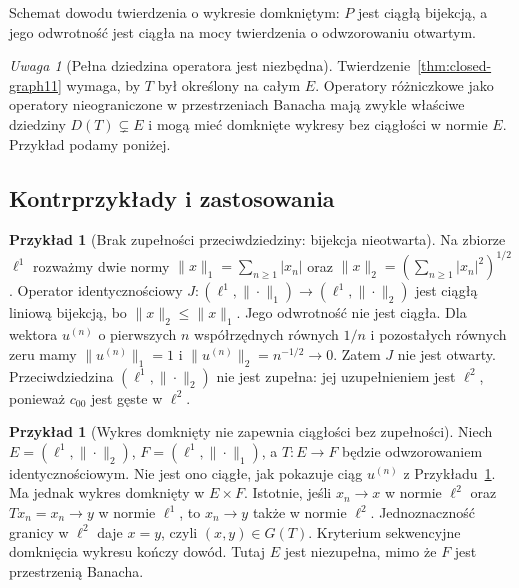 \documentclass[11pt,a4paper]{article}
\numberwithin{equation}{section}
\theoremstyle{plain}
\theoremstyle{definition}
\newtheorem{przyklad}[twierdzenie]{Przykład}
\theoremstyle{remark}
\newtheorem{uwaga}[twierdzenie]{Uwaga}
\begin{document}
\begin{center}

\smallskip
\small Schemat dowodu twierdzenia o wykresie domkniętym:
$P$ jest ciągłą bijekcją, a jego odwrotność jest ciągła
na mocy twierdzenia o odwzorowaniu otwartym.
\end{center}

\begin{uwaga}[Pełna dziedzina operatora jest niezbędna]
Twierdzenie~\ref{thm:closed-graph11} wymaga, by $T$ był
określony na całym $E$. Operatory różniczkowe jako
operatory nieograniczone w przestrzeniach Banacha mają
zwykle właściwe dziedziny $D(T)\subsetneq E$ i mogą
mieć domknięte wykresy bez ciągłości w normie $E$.
Przykład podamy poniżej.
\end{uwaga}

\subsection{Kontrprzykłady i zastosowania}

\begin{przyklad}[Brak zupełności przeciwdziedziny: bijekcja nieotwarta]
\label{ex:incomplete-codomain11}
Na zbiorze $\ell^1$ rozważmy dwie normy
$\|x\|_1=\sum_{n\ge1}|x_n|$ oraz
$\|x\|_2=(\sum_{n\ge1}|x_n|^2)^{1/2}$.
Operator identycznościowy
$J:(\ell^1,\|\cdot\|_1)\to(\ell^1,\|\cdot\|_2)$
jest ciągłą liniową bijekcją, bo $\|x\|_2\le\|x\|_1$.
Jego odwrotność nie jest ciągła. Dla wektora $u^{(n)}$
o pierwszych $n$ współrzędnych równych $1/n$
i pozostałych równych zeru mamy
$\|u^{(n)}\|_1=1$ i $\|u^{(n)}\|_2=n^{-1/2}\to0$.
Zatem $J$ nie jest otwarty. Przeciwdziedzina
$(\ell^1,\|\cdot\|_2)$ nie jest zupełna: jej
uzupełnieniem jest $\ell^2$, ponieważ $c_{00}$ jest
gęste w $\ell^2$.
\end{przyklad}

\begin{przyklad}[Wykres domknięty nie zapewnia ciągłości bez zupełności]
\label{ex:incomplete-domain-graph11}
Niech $E=(\ell^1,\|\cdot\|_2)$, $F=(\ell^1,\|\cdot\|_1)$,
a $T:E\to F$ będzie odwzorowaniem identycznościowym.
Nie jest ono ciągłe, jak pokazuje ciąg $u^{(n)}$ z
Przykładu~\ref{ex:incomplete-codomain11}. Ma jednak
wykres domknięty w $E\times F$. Istotnie, jeśli
$x_n\to x$ w normie $\ell^2$ oraz
$Tx_n=x_n\to y$ w normie $\ell^1$, to $x_n\to y$
także w normie $\ell^2$. Jednoznaczność granicy
w $\ell^2$ daje $x=y$, czyli $(x,y)\in G(T)$.
Kryterium sekwencyjne domknięcia wykresu kończy dowód.
Tutaj $E$ jest niezupełna, mimo że $F$ jest przestrzenią Banacha.
\end{przyklad}
\end{document}
